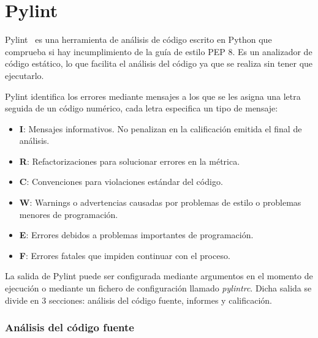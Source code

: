 \documentclass[a4paper, 12pt]{book}
\begin{document}
\section{Pylint} 
\label{sec:pylint}
Pylint~\cite{pylint} es una herramienta de análisis de código escrito en Python que comprueba si hay incumplimiento de la guía de estilo PEP 8. Es un analizador de código estático, lo que facilita el análisis del código ya que se realiza sin tener que ejecutarlo.

Pylint identifica los errores mediante mensajes a los que se les asigna una letra seguida de un código numérico, cada letra especifica un tipo de mensaje:
\begin{itemize}
	\item \textbf{I}: Mensajes informativos. No penalizan en la calificación emitida el final de análisis.
	\item \textbf{R}: Refactorizaciones para solucionar errores en la métrica.
	\item \textbf{C}: Convenciones para violaciones estándar del código.
	\item \textbf{W}: Warnings o advertencias causadas por problemas de estilo o problemas menores de programación.
	\item \textbf{E}: Errores debidos a problemas importantes de programación.
	\item \textbf{F}: Errores fatales que impiden continuar con el proceso.
\end{itemize}

La salida de Pylint puede ser configurada mediante argumentos en el momento de ejecución o mediante un fichero de configuración llamado \textit{pylintrc}.
Dicha salida se divide en 3 secciones: análisis del código fuente, informes y calificación.

\subsubsection{Análisis del código fuente}
\end{document}
